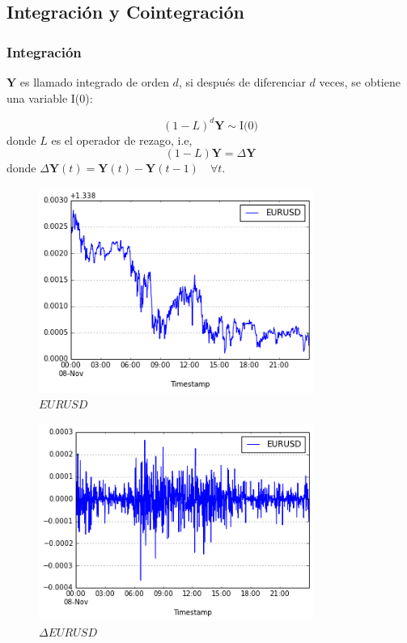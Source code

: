 \documentclass{beamer}
\begin{document}
        \subsection{Integración y Cointegración}
            \begin{frame}
            \frametitle{Integración} 
            $\mathbf{Y}$ es llamado integrado de orden $d$, si después de
            diferenciar $d$ veces, se obtiene una variable I(0):
            
            \[
            (1-L)^d \mathbf{Y} \sim \text{I(0)}
            \]
            \noindent donde $L$ es el operador de rezago, i.e,
            \[
            (1-L)\mathbf{Y} = \Delta \mathbf{Y}
            \]
            \noindent donde $\Delta \mathbf{Y}(t) = \mathbf{Y}(t)  -\mathbf{Y}(t-1) \quad \forall t $.
            \end{frame}
            \begin{frame}  
            \begin{figure}[h]
                \centering
                \includegraphics[width=0.8\textwidth]{img/euro_ppt}
                \caption{$EURUSD$}
                \label{fig:cpu_gpu_arch}
            \end{figure}
            \end{frame}
            \begin{frame}  
            \begin{figure}[h]
                \centering
                \includegraphics[width=0.8\textwidth]{img/euro_ppt_diff}
                \caption{$\Delta EURUSD$}
                \label{fig:cpu_gpu_arch}
            \end{figure}
            \end{frame}
                      
\end{document}
